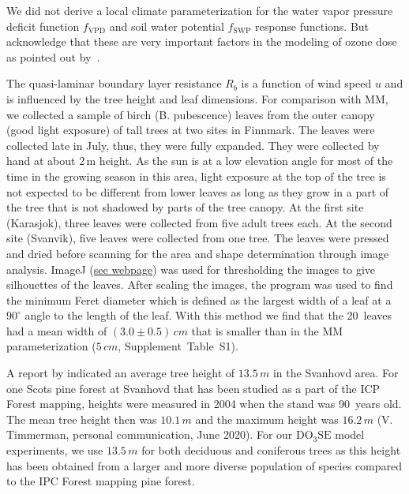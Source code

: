 \documentclass[bg, manuscript]{copernicus}
\begin{document}
We did not derive a local climate parameterization for the water vapor pressure deficit function $f_\mathrm{VPD}$ and soil water potential $f_\mathrm{SWP}$ response functions. But acknowledge that these are very important factors in the modeling of ozone dose as pointed out by~\citet{ACP:Bueker2012}.

The quasi-laminar boundary layer resistance $R_b$ is a function of wind speed $u$ and is influenced by the tree height and leaf dimensions. For comparison with MM, we collected a sample of birch (B. pubescence) leaves from the outer canopy (good light exposure) of tall trees at two sites in Finnmark. The leaves were collected late in July, thus, they were fully expanded. They were collected by hand at about $2\,\mathrm{m}$ height. As the sun is at a low elevation angle for most of the time in the growing season in this area, light exposure at the top of the tree is not expected to be different from lower leaves as long as they grow in a part of the tree that is not shadowed by parts of the tree canopy. At the first site (Karasjok), three leaves were collected from five adult trees each. At the second site (Svanvik), five leaves were collected from one tree. The leaves were pressed and dried before scanning for the area and shape determination through image analysis. ImageJ (\href{https://imagej.nih.gov/ij/}{see webpage}) was used for thresholding the images to give silhouettes of the leaves. After scaling the images, the program was used to find the minimum Feret diameter which is defined as the largest width of a leaf at a $90^\circ$ angle to the length of the leaf. With this method we find that the 20~leaves had a mean width of $(3.0\pm 0.5)\,\unit{cm}$ that is smaller than in the MM parameterization ($5\,\unit{cm}$, Supplement~Table~S1). 

A report by \citet[][p.~52]{NINA2004} indicated an average tree height of $13.5\,\unit{m}$ in the Svanhovd area. For one Scots pine forest at Svanhovd that has been studied as a part of the ICP Forest mapping, heights were measured in 2004 when the stand was 90~years old. The mean tree height then was $10.1\,\unit{m}$ and the maximum height was $16.2\,\unit{m}$ (V. Timmerman, personal communication, June 2020). For our $\mathrm{DO_3SE}$ model experiments, we use $13.5\,\unit{m}$ for both deciduous and coniferous trees as this height has been obtained from a larger and more diverse population of species compared to the IPC Forest mapping pine forest.
\end{document}
